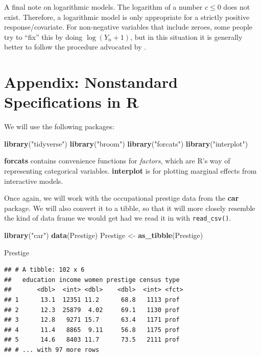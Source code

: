 \documentclass[
  12pt,
  oneside,openany]{book}
\newenvironment{Shaded}{\begin{snugshade}}{\end{snugshade}}
\newcommand{\KeywordTok}[1]{\textcolor[rgb]{0.13,0.29,0.53}{\textbf{#1}}}
\newcommand{\NormalTok}[1]{#1}
\newcommand{\StringTok}[1]{\textcolor[rgb]{0.31,0.60,0.02}{#1}}
\begin{document}
A final note on logarithmic models. The logarithm of a number \(c \leq 0\) does not exist. Therefore, a logarithmic model is only appropriate for a strictly positive response/covariate. For non-negative variables that include zeroes, some people try to ``fix'' this by doing \(\log(Y_n + 1)\), but in this situation it is generally better to follow the procedure advocated by \citet{burbidge1988alternative}.

\hypertarget{appendix-nonstandard-specifications-in-r}{%
\section{Appendix: Nonstandard Specifications in R}\label{appendix-nonstandard-specifications-in-r}}

We will use the following packages:

\begin{Shaded}
\begin{Highlighting}[]
\KeywordTok{library}\NormalTok{(}\StringTok{"tidyverse"}\NormalTok{)}
\KeywordTok{library}\NormalTok{(}\StringTok{"broom"}\NormalTok{)}
\KeywordTok{library}\NormalTok{(}\StringTok{"forcats"}\NormalTok{)}
\KeywordTok{library}\NormalTok{(}\StringTok{"interplot"}\NormalTok{)}
\end{Highlighting}
\end{Shaded}

\textbf{forcats} contains convenience functions for \emph{factors}, which are R's way of representing categorical variables. \textbf{interplot} is for plotting marginal effects from interactive models.

Once again, we will work with the occupational prestige data from the \textbf{car} package. We will also convert it to a tibble, so that it will more closely resemble the kind of data frame we would get had we read it in with \texttt{read\_csv()}.

\begin{Shaded}
\begin{Highlighting}[]
\KeywordTok{library}\NormalTok{(}\StringTok{"car"}\NormalTok{)}
\KeywordTok{data}\NormalTok{(Prestige)}
\NormalTok{Prestige <{-}}\StringTok{ }\KeywordTok{as\_tibble}\NormalTok{(Prestige)}

\NormalTok{Prestige}
\end{Highlighting}
\end{Shaded}

\begin{verbatim}
## # A tibble: 102 x 6
##   education income women prestige census type 
##       <dbl>  <int> <dbl>    <dbl>  <int> <fct>
## 1      13.1  12351 11.2      68.8   1113 prof 
## 2      12.3  25879  4.02     69.1   1130 prof 
## 3      12.8   9271 15.7      63.4   1171 prof 
## 4      11.4   8865  9.11     56.8   1175 prof 
## 5      14.6   8403 11.7      73.5   2111 prof 
## # ... with 97 more rows
\end{verbatim}
\end{document}
